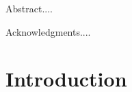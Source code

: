 \documentclass{pdfmx4020}
\begin{document}
\newfrontpage


\begin{Abstract}
Abstract....
\end{Abstract}

\begin{Acknowledgments}
Acknowledgments....
\end{Acknowledgments}

\StartThesis

\chapter{Introduction}




\end{document}
